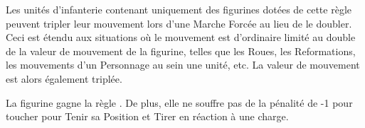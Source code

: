 \newcommand{\volcanocannonrule}{%
Peut tirer de deux manières :
\begin{itemize}[label={-}]
\item \textbf{\artilleryweapon} de type \textbf{\flamethrower{}}.\newline
\range{15}, \Strength{} 5, \flamingattacks{}, \multiplewounds{1D3}{}.
\item \textbf{\artilleryweapon} de type \textbf{\flamethrower{}}.\newline
\range{24}, \Strength{} 1.\newline
Les unités touchées gagnent la règle \flammable{} et les \flamingattacks{} dirigées contre elles gagnent la règle \divineattacks{}. Ces effets durent jusqu'à la fin du Tour de Joueur suivant.
\end{itemize}
}

\newcommand{\titanmortarrule}{%
\textbf{\artilleryweapon} de type \textbf{\catapult{}}.\newline
\range{6-48}, \Strength{} 4 [9], [\multiplewounds{\ordnance}{}]. 
}

\newcommand{\hobgoblinboltthrowerrule}{%
\textbf{\artilleryweapon} de type \textbf{\boltthrower{}}.\newline
\range{48}, \Strength{} 6, \multiplewounds{1D3}{}, \armourpiercing{6}. 
}

\newcommand{\gunneryteamrule}{%
\textbf{\artilleryweapon} de type \textbf{\volleygun{}}.\newline
\range{24}, \Strength{} 4, \multipleshots{1D6, 2D6 ou 3D6}{}. 
}










\vspace*{1.5cm}
\startarmyspecialrules

\armyspecialruleentry{\relentless{}}

Les unités d'infanterie contenant uniquement des figurines dotées de cette règle peuvent tripler leur mouvement lors d'une Marche Forcée au lieu de le doubler. Ceci est étendu aux situations où le mouvement est d'ordinaire limité au double de la valeur de mouvement de la figurine, telles que les Roues, les Reformations, les mouvements d'un Personnage au sein une unité, etc. La valeur de mouvement est alors également triplée.

\armyspecialruleentry{\sturdy{}}

La figurine gagne la règle \thunderouscharge{}. De plus, elle ne souffre pas de la pénalité de -1 pour toucher pour Tenir sa Position et Tirer en réaction à une charge.

